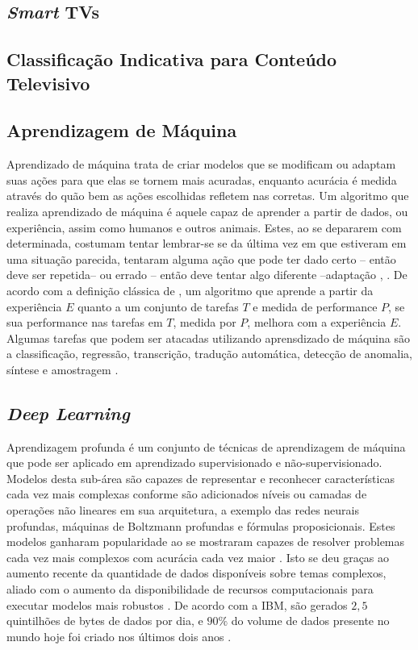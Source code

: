 
\subsection{\emph{Smart} TVs}


\subsection{Classificação Indicativa para Conteúdo Televisivo}


\subsection{Aprendizagem de Máquina}
Aprendizado de máquina trata de criar modelos que se modificam ou adaptam suas ações para que elas se tornem mais acuradas, enquanto acurácia é medida através do quão bem as ações escolhidas refletem nas corretas.
Um algoritmo que realiza aprendizado de máquina é aquele capaz de aprender a partir de dados, ou experiência, assim como humanos e outros animais. Estes, ao se depararem com determinada, costumam tentar lembrar-se se da última vez em que estiveram em uma situação parecida, tentaram alguma ação que pode ter dado certo -- então deve ser repetida-- ou errado -- então deve tentar algo diferente --adaptação \cite{marsland2015machine}, \cite{goodfellow2016deep}. De acordo com a definição clássica de \cite{mitchell1997machine}, um algoritmo que aprende a partir da experiência $E$ quanto a um conjunto de tarefas $T$ e medida de performance $P$, se sua performance nas tarefas em $T$, medida por $P$, melhora com a experiência $E$.
Algumas tarefas que podem ser atacadas utilizando aprensdizado de máquina são a classificação, regressão, transcrição, tradução automática, detecção de anomalia, síntese e amostragem \cite{goodfellow2016deep}.


\subsection{\emph{Deep Learning}}
Aprendizagem profunda é um conjunto de técnicas de aprendizagem de máquina que pode ser aplicado em aprendizado supervisionado e não-supervisionado. Modelos desta sub-área são capazes de representar e reconhecer características cada vez mais complexas conforme são adicionados níveis ou camadas de operações não lineares em sua arquitetura, a exemplo das redes neurais profundas, máquinas de Boltzmann profundas e fórmulas proposicionais. Estes modelos ganharam popularidade ao se mostraram capazes de resolver problemas cada vez mais complexos com acurácia cada vez maior \cite{bengio2009learning}. Isto se deu graças ao aumento recente da quantidade de dados disponíveis sobre temas complexos, aliado com o aumento da disponibilidade de recursos computacionais para executar modelos mais robustos \cite{goodfellow2016deep}. De acordo com a IBM, são gerados $2,5$ quintilhões de bytes de dados por dia, e $90\%$ do volume de dados presente no mundo hoje foi criado nos últimos dois anos \cite{ibm2017bigdata}.

